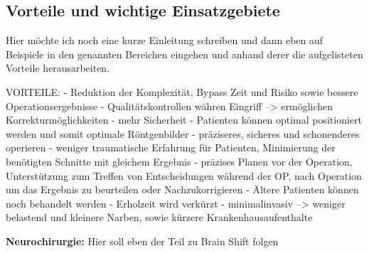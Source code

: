 
\subsection{Vorteile und wichtige Einsatzgebiete}

Hier möchte ich noch eine kurze Einleitung schreiben und dann eben auf Beispiele in den genannten Bereichen eingehen und anhand derer die aufgelisteten Vorteile herausarbeiten.

VORTEILE:
- Reduktion der Komplexität, Bypass Zeit und Risiko  sowie bessere Operationsergebnisse
- Qualitätskontrollen währen Eingriff --> ermöglichen Korrekturmöglichkeiten
- mehr Sicherheit
- Patienten können optimal positioniert werden und somit optimale Röntgenbilder
- präziseres, sicheres und schonenderes operieren
- weniger traumatische Erfahrung für Patienten, Minimierung der benötigten Schnitte mit gleichem Ergebnis
- präzises Planen vor der Operation, Unterstützung zum Treffen von Entscheidungen während der OP, nach Operation um das Ergebnis zu beurteilen oder Nachzukorrigieren
- Ältere Patienten können noch behandelt werden
- Erholzeit wird verkürzt
- minimalinvasiv --> weniger belastend und kleinere Narben, sowie kürzere Krankenhausaufenthalte



\textbf{Neurochirurgie:}
Hier soll eben der Teil zu Brain Shift folgen

